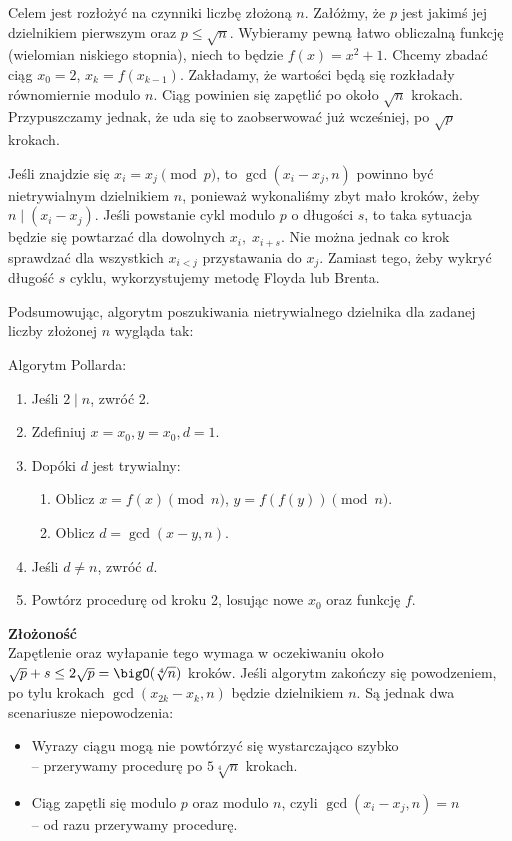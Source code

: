 Celem jest rozłożyć na czynniki liczbę złożoną \( n \). Załóżmy, że \( p \) jest jakimś jej dzielnikiem pierwszym oraz \( p \leq \sqrt{n} \).
Wybieramy pewną łatwo obliczalną funkcję (wielomian niskiego stopnia), niech to będzie \( f(x) = x^2 + 1 \). Chcemy zbadać ciąg \( x_0 = 2 \), \( x_k = f(x_{k-1}) \).
Zakładamy, że wartości będą się rozkładały równomiernie modulo \( n \). Ciąg powinien się zapętlić po około \( \sqrt{n} \) krokach. Przypuszczamy jednak, że uda się to zaobserwować już wcześniej, po \( \sqrt{p} \) krokach.

Jeśli znajdzie się \( x_i = x_j \pmod{p} \), to \( \gcd(x_i - x_j, n) \) powinno być nietrywialnym dzielnikiem \( n \), ponieważ wykonaliśmy zbyt mało kroków, żeby \( n \mid (x_i - x_j) \).
Jeśli powstanie cykl modulo \( p \) o długości \( s \), to taka sytuacja będzie się powtarzać dla dowolnych \( x_i,\; x_{i+s} \). Nie można jednak co krok sprawdzać dla wszystkich \( x_{i<j} \) przystawania do \( x_j \).
Zamiast tego, żeby wykryć długość \( s \) cyklu, wykorzystujemy metodę Floyda lub Brenta.

Podsumowując, algorytm poszukiwania nietrywialnego dzielnika dla zadanej liczby złożonej \( n \) wygląda tak:
\begin{greyframe}
    Algorytm Pollarda:
    \begin{enumerate}
        \item Jeśli \( 2 \mid n \), zwróć 2.
        \item Zdefiniuj \( x = x_0, y = x_0, d = 1 \).
        \item Dopóki \( d \) jest trywialny:
        \begin{enumerate}
            \item Oblicz \( x = f(x) \pmod{n} \), \( y = f(f(y)) \pmod{n} \).
            \item Oblicz \( d = \gcd(x-y, n) \).
        \end{enumerate}
        \item Jeśli \( d \neq n \), zwróć \( d \).
        \item Powtórz procedurę od kroku 2, losując nowe \( x_0 \) oraz funkcję \( f \).
    \end{enumerate}
\end{greyframe}

\textbf{Złożoność} \\
Zapętlenie oraz wyłapanie tego wymaga w oczekiwaniu około \( \sqrt{p} + s \leq 2\sqrt{p} = \bigO(\sqrt[4]{n}) \) kroków. Jeśli algorytm zakończy się powodzeniem, po tylu krokach \( \gcd(x_{2k} - x_k, n )\) będzie dzielnikiem \( n \).
Są jednak dwa scenariusze niepowodzenia:
\begin{itemize}
    \item Wyrazy ciągu mogą nie powtórzyć się wystarczająco szybko \\
    -- przerywamy procedurę po \( 5\sqrt[4]{n} \) krokach.
    \item Ciąg zapętli się modulo \( p \) oraz modulo \( n \), czyli \( \gcd(x_i - x_j, n) = n \) \\
    -- od razu przerywamy procedurę.
\end{itemize}

